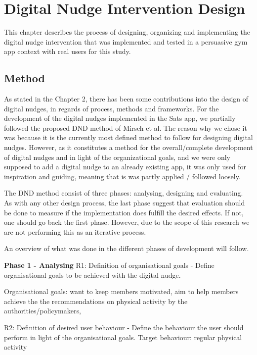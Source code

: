 \chapter{Digital Nudge Intervention Design}
This chapter describes the process of designing, organizing and implementing the digital nudge intervention that was implemented and tested in a persuasive gym app context with real users for this study. 

\section{Method} 
As stated in the Chapter 2, there has been some contributions into the design of digital nudges, in regards of process, methods and frameworks. For the development of the digital nudges implemented in the Sats app, we partially followed the proposed DND method of Mirsch et al. The reason why we chose it was because it is the currently most defined method to follow for designing digital nudges. However, as it constitutes a method for the overall/complete development of digital nudges and in light of the organizational goals, and we were only supposed to add a digital nudge to an already existing app, it was only used for inspiration and guiding, meaning that is was partly applied / followed loosely.

The DND method consist of three phases: analysing, designing and evaluating. As with any other design process, the last phase suggest that evaluation should be done to measure if the implementation does fulfill the desired effects. If not, one should go back the first phase. However, due to the scope of this research we are not performing this as an iterative process. 

An overview of what was done in the different phases of development will follow. 

\textbf{Phase 1 - Analysing}
R1: Definition of organisational goals - Define organisational goals to be achieved with the digital nudge. 

Organisational goals: want to keep members motivated, aim to help members achieve the the recommendations on physical activity by the authorities/policymakers, 

R2: Definition of desired user behaviour - Define the behaviour the user should perform in light of the organisational goals. 
Target behaviour: regular physical activity 

